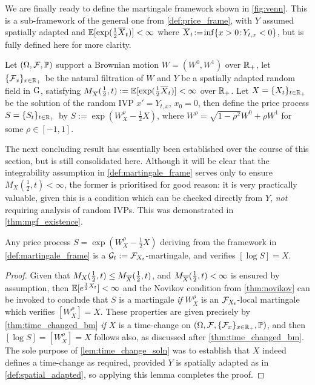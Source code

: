 We are finally ready to define the martingale framework shown in \autoref{fig:venn}. This is a sub-framework of the general one from \autoref{def:price_frame}, with $Y$ assumed spatially adapted and $\mathbb{E}[\exp(\frac12 {\overline{X}}_t)]<\infty$ where ${\overline{X}}_t\!:=\!\inf\{x>0\!:\!Y_{t,x}<0\}$, but is fully defined here for more clarity.

\begin{definition}\label{def:martingale_frame}
    Let $(\Omega, \mathcal{F},\mathbb{P})$ support a Brownian motion $W=(W^0,W^1)$ over $\mathbb{R}_+$, let $\{\mathcal{F}_x\}_{x\in\mathbb{R}_+}$ be the natural filtration of $W$ and $Y$ be a spatially adapted random field in $\mathrm{G}$, satisfying $M_{\overline{X}}(\frac12,t):=\mathbb{E}[\exp(\frac12 {\overline{X}}_t)]<\infty$ over $\mathbb{R}_+$. Let $X=\{X_t\}_{t\in\mathbb{R}_+}$ be the solution of the random IVP $x'=Y_{t,x}$, $x_0=0$, then define the price process $S=\{S_t\}_{t\in\mathbb{R}_+}$ by $S:=\exp(W^\rho_{X}-\frac12 X)$, where $W^\rho=\sqrt{1-\rho^2}W^0 + \rho W^1$ for some $\rho\in[-1,1]$.
\end{definition}

The next concluding result has essentially been established over the course of this section, but is still consolidated here. Although it will be clear that the integrability assumption in \autoref{def:martingale_frame} serves only to ensure $M_X(\frac12,t)<\infty$, the former is prioritised for good reason: it is very practically valuable, given this is a condition which can be checked directly from $Y$, \emph{not} requiring analysis of random IVPs. This was demonstrated in \autoref{thm:mgf_existence}.

\begin{theorem}\label{thm:price_martingale}
    Any price process $S=\exp(W^\rho_X-\frac12 X)$ deriving from the framework in \autoref{def:martingale_frame} is a $\mathcal{G}_t:=\mathcal{F}_{X_t}$-martingale, and verifies $[\log S] = X$.
\end{theorem}
\begin{proof}
    Given that $M_X(\frac12,t)\le M_{\overline{X}}(\frac12,t)$, and $M_{\overline{X}}(\frac12,t)<\infty$ is ensured by assumption, then $\mathbb{E}[e^{\frac12 X_t}]<\infty$ and the Novikov condition from \autoref{thm:novikov} can be invoked to conclude that $S$ is a martingale \emph{if} $W^\rho_X$ is an $\mathcal{F}_{X_t}$-local martingale which verifies $[W^\rho_X]=X$. These properties are given precisely by \autoref{thm:time_changed_bm} \emph{if} $X$ is a time-change on $(\Omega,\mathcal{F},\{\mathcal{F}_x\}_{x\in\mathbb{R}_+},\mathbb{P})$, and then $[\log S] = [W^\rho_X] =X$ follows also, as discussed after \autoref{thm:time_changed_bm}. The sole purpose of \autoref{lem:time_change_soln} was to establish that $X$ indeed defines a time-change as required, provided $Y$ is spatially adapted as in \autoref{def:spatial_adapted}, so applying this lemma completes the proof.
\end{proof}

